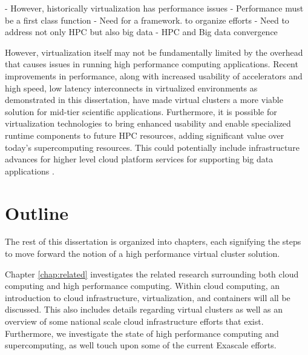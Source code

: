 






- However, historically virtualization has performance issues
- Performance must be a first class function
- Need for a framework.  to organize efforts
- Need to address not only HPC but also big data
- HPC and Big data convergence 



However, virtualization itself may not be fundamentally limited by the overhead that causes issues in running high performance computing applications. Recent improvements in performance, along with increased usability of accelerators and high speed, low latency interconnects in virtualized environments as demonstrated in this dissertation, have made virtual clusters a more viable solution for mid-tier scientific applications.  Furthermore, it is possible for  virtualization technologies to bring enhanced usability and enable specialized runtime components to future HPC resources, adding significant value over today's supercomputing resources.  This could potentially include infrastructure advances for higher level cloud platform services for supporting big data applications \cite{qiu2014towards}. 







\section{Outline}
\label{sec:outline}


The rest of this dissertation is organized into chapters, each signifying the steps to move forward the notion of a high performance virtual cluster solution.

Chapter \ref{chap:related} investigates the related research surrounding both cloud computing and high performance computing. Within cloud computing, an introduction to cloud infrastructure, virtualization, and containers will all be discussed. This also includes details regarding virtual clusters as well as an overview of some national scale cloud infrastructure efforts that exist. Furthermore, we investigate the state of high performance computing and supercomputing, as well touch upon some of the current Exascale efforts.

